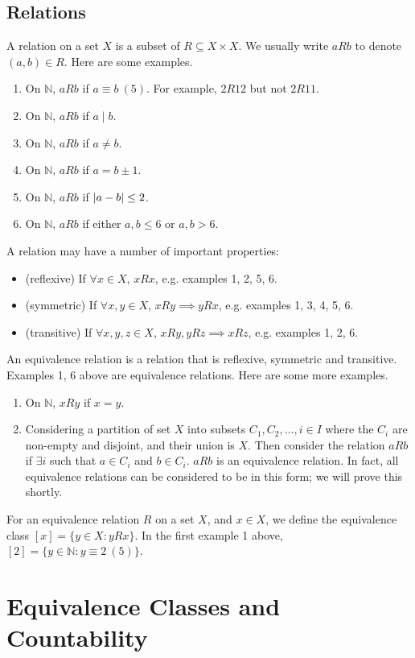 \documentclass{article}
\begin{document}
\subsection{Relations}
A relation on a set $X$ is a subset of $R \subseteq X \times X$. We usually write $aRb$ to denote $(a, b) \in R$. Here are some examples.
\begin{enumerate}
	\item On $\mathbb N$, $aRb$ if $a \equiv b\ (5)$. For example, $2R12$ but not $2R11$.
	\item On $\mathbb N$, $aRb$ if $a \mid b$.
	\item On $\mathbb N$, $aRb$ if $a \neq b$.
	\item On $\mathbb N$, $aRb$ if $a=b \pm 1$.
	\item On $\mathbb N$, $aRb$ if $\abs{a-b} \leq 2$.
	\item On $\mathbb N$, $aRb$ if either $a, b \leq 6$ or $a, b > 6$.
\end{enumerate}
A relation may have a number of important properties:
\begin{itemize}
	\item (reflexive) If $\forall x \in X$, $xRx$, e.g. examples 1, 2, 5, 6.
	\item (symmetric) If $\forall x, y \in X$, $xRy \implies yRx$, e.g. examples 1, 3, 4, 5, 6.
	\item (transitive) If $\forall x, y, z \in X$, $xRy, yRz \implies xRz$, e.g. examples 1, 2, 6.
\end{itemize}
An equivalence relation is a relation that is reflexive, symmetric and transitive. Examples 1, 6 above are equivalence relations. Here are some more examples.
\begin{enumerate}
	\item On $\mathbb N$, $xRy$ if $x=y$.
	\item Considering a partition of set $X$ into subsets $C_1, C_2, \dots, i \in I$ where the $C_i$ are non-empty and disjoint, and their union is $X$. Then consider the relation $aRb$ if $\exists i$ such that $a \in C_i$ and $b \in C_i$. $aRb$ is an equivalence relation. In fact, all equivalence relations can be considered to be in this form; we will prove this shortly.
\end{enumerate}
For an equivalence relation $R$ on a set $X$, and $x \in X$, we define the equivalence class $[x] = \{ y \in X: y R x \}$. In the first example 1 above, $[2] = \{ y \in \mathbb N : y \equiv 2\ (5) \}$.

\section{Equivalence Classes and Countability}
\end{document}
